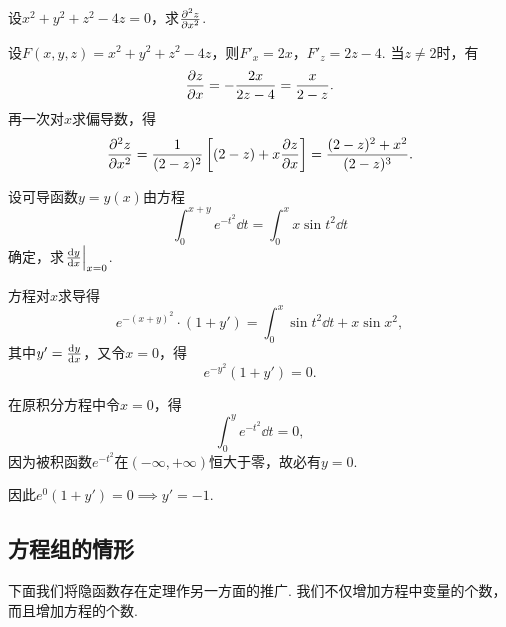 \begin{example}
设\(x^2+y^2+z^2-4z=0\)，求\(\pdv[2]{z}{x}\).
\begin{solution}
设\(F(x,y,z) = x^2+y^2+z^2-4z\)，则\(F'_x = 2x\)，\(F'_z = 2z-4\).
当\(z\neq2\)时，有\[
\pdv{z}{x} = -\frac{2x}{2z-4} = \frac{x}{2-z}.
\]再一次对\(x\)求偏导数，得\[
\pdv[2]{z}{x}
= \frac{1}{(2-z)^2} \left[ (2-z)+x\pdv{z}{x} \right]
= \frac{(2-z)^2+x^2}{(2-z)^3}.
\]
\end{solution}
\end{example}

\begin{example}
设可导函数\(y = y(x)\)由方程\[
\int_0^{x+y} e^{-t^2} \dd{t}
= \int_0^x x \sin t^2 \dd{t}
\]确定，求\(\eval{\dv{y}{x}}_{x=0}\).
\begin{solution}
方程对\(x\)求导得\[
e^{-(x+y)^2} \cdot (1+y')
= \int_0^x \sin t^2 \dd{t} + x \sin x^2,
\]其中\(y' = \dv{y}{x}\)，又令\(x=0\)，得\[
e^{-y^2} (1+y') = 0.
\]

在原积分方程中令\(x=0\)，得\[
\int_0^y e^{-t^2} \dd{t} = 0,
\]因为被积函数\(e^{-t^2}\)在\((-\infty,+\infty)\)恒大于零，故必有\(y = 0\).

因此\(e^0 (1+y') = 0 \implies y'=-1\).
\end{solution}
\end{example}

\subsection{方程组的情形}
下面我们将隐函数存在定理作另一方面的推广.
我们不仅增加方程中变量的个数，而且增加方程的个数.

